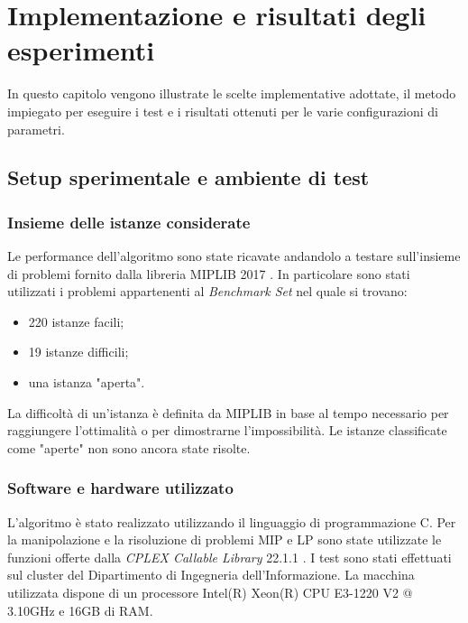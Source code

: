 \chapter{Implementazione e risultati degli esperimenti}%
\label{cha:Implementazione e risultati degli esperimenti}
In questo capitolo vengono illustrate le scelte implementative adottate,
il metodo impiegato per eseguire i test e i risultati ottenuti per le varie
configurazioni di parametri.

\section{Setup sperimentale e ambiente di test}%
\label{sec:Setup sperimentale e ambiente di test}

\subsection{Insieme delle istanze considerate}%
\label{sub:Insieme delle istanze considerate}
Le performance dell'algoritmo sono state ricavate andandolo a testare
sull'insieme di problemi fornito dalla libreria MIPLIB 2017 \cite{miplib2017}.
In particolare sono stati utilizzati i problemi appartenenti al \emph{Benchmark Set}
nel quale si trovano:
\begin{itemize}
    \item 220 istanze facili;
    \item 19 istanze difficili;
    \item una istanza "aperta".
\end{itemize}
La difficoltà di un'istanza è definita da MIPLIB in base al tempo necessario
per raggiungere l'ottimalità o per dimostrarne l'impossibilità.
Le istanze classificate come "aperte" non sono ancora state risolte.

\subsection{Software e hardware utilizzato}%
\label{sub:Software utilizzato}
L'algoritmo è stato realizzato utilizzando il linguaggio di programmazione C.
Per la manipolazione e la risoluzione di problemi MIP e LP sono state
utilizzate le funzioni offerte dalla \emph{CPLEX Callable Library} 22.1.1
\cite{cplexCallableLib}.
I test sono stati effettuati sul cluster del Dipartimento di Ingegneria dell'Informazione.
La macchina utilizzata dispone di un processore Intel(R) Xeon(R) CPU E3-1220
V2 @ 3.10GHz e 16GB di RAM.

